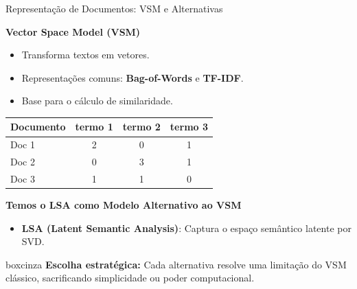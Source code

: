 \documentclass[aspectratio=43]{beamer}
\begin{document}
\begin{frame}[t]{Representação de Documentos: VSM e Alternativas}

\vspace{0.1cm}

\textbf{Vector Space Model (VSM)}
\begin{itemize}
    \scriptsize
    \item Transforma textos em vetores.
    \item Representações comuns: \textbf{Bag-of-Words} e \textbf{TF-IDF}.
    \item Base para o cálculo de similaridade.
\end{itemize}

\vspace{0.05cm}

\begin{center}
\tiny
\renewcommand{\arraystretch}{1.1}
\begin{tabular}{lccc}
\hline
\textbf{Documento} & \textbf{termo 1} & \textbf{termo 2} & \textbf{termo 3} \\
\hline
Doc 1 & 2 & 0 & 1 \\
Doc 2 & 0 & 3 & 1 \\
Doc 3 & 1 & 1 & 0 \\
\hline
\end{tabular}
\end{center}

\textbf{Temos o LSA como Modelo Alternativo ao VSM}
\begin{itemize}
    \item \textbf{LSA (Latent Semantic Analysis)}: Captura o espaço semântico latente por SVD.
\end{itemize}

\vspace{0.6cm}

\begin{beamercolorbox}[wd=\textwidth, sep=0.15cm]{boxcinza}
    \tiny \color{uelgreen} \textbf{Escolha estratégica:} Cada alternativa resolve uma limitação do VSM clássico, sacrificando simplicidade ou poder computacional.
\end{beamercolorbox}

\end{frame}
\end{document}
